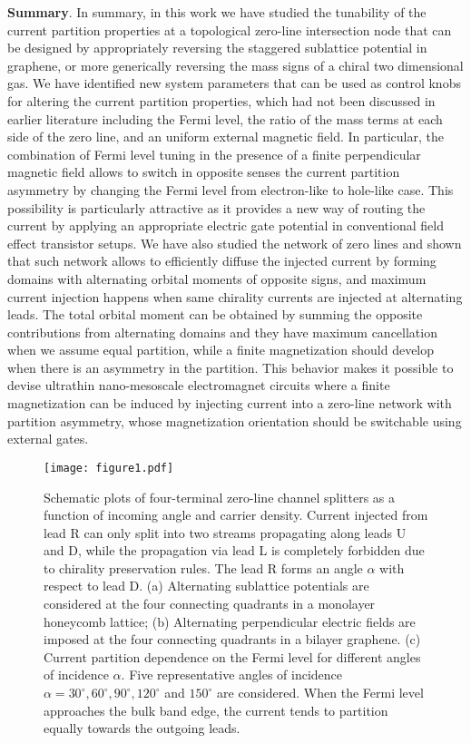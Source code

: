 \documentclass[journal=nalefd,manuscript=communication]{achemso}
\begin{document}
\textbf{Summary}.
In summary, in this work we have studied the tunability of the current partition properties at a topological zero-line intersection node that can be designed by appropriately reversing the staggered sublattice potential in graphene, or more generically reversing the mass signs of a chiral two dimensional gas. We have identified new system parameters that can be used as control knobs for altering the current partition properties, which had not been discussed in earlier literature including the Fermi level, the ratio of the mass terms at each side of the zero line, and an uniform external magnetic field. In particular, the combination of Fermi level tuning in the presence of a finite perpendicular magnetic field allows to switch in opposite senses the current partition asymmetry by changing the Fermi level from electron-like to hole-like case. This possibility is particularly attractive as it provides a new way of routing the current by applying an appropriate electric gate potential in conventional field effect transistor setups. We have also studied the network of zero lines and shown that such network allows to efficiently diffuse the injected current by forming domains with alternating orbital moments of opposite signs, and maximum current injection happens when same chirality currents are injected at alternating leads. The total orbital moment can be obtained by summing the opposite contributions from alternating domains and they have maximum cancellation when we assume equal partition, while a finite magnetization should develop when there is an asymmetry in the partition. This behavior makes it possible to devise ultrathin nano-mesoscale electromagnet circuits where a finite magnetization can be induced by injecting current into a zero-line network with partition asymmetry, whose magnetization orientation should be switchable using external gates.

\newpage

\begin{figure}
  \texttt{[image: figure1.pdf]}
  \caption{Schematic plots of four-terminal zero-line channel splitters as a function of incoming angle and carrier density. Current injected from lead R can only split into two streams propagating along leads U and D, while the propagation via lead L is completely forbidden due to chirality preservation rules. The lead R forms an angle $\alpha$ with respect to lead D. (a) Alternating sublattice potentials are considered at the four connecting quadrants in a monolayer honeycomb lattice; (b) Alternating perpendicular electric fields are imposed at the four connecting quadrants in a bilayer graphene. (c) Current partition dependence on the Fermi level for different angles of incidence $\alpha$. Five representative angles of incidence $\alpha=30^\circ,60^\circ,90^\circ,120^\circ$ and $150^\circ$ are considered. When the Fermi level approaches the bulk band edge, the current tends to partition equally towards the outgoing leads.}
  \label{Fig1}
\end{figure}
\end{document}
